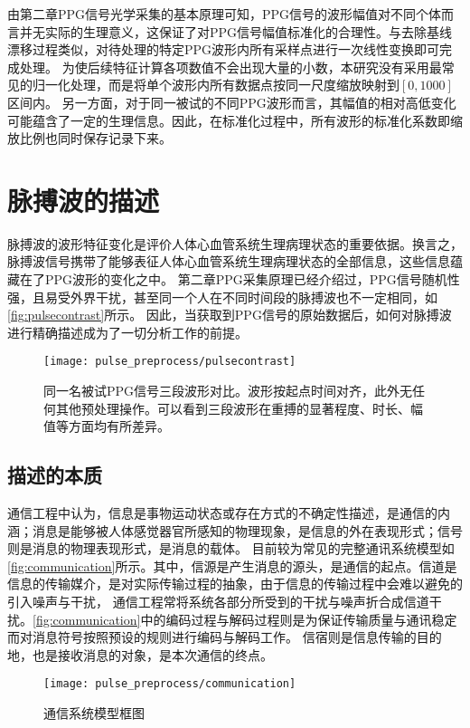 由第二章PPG信号光学采集的基本原理可知，PPG信号的波形幅值对不同个体而言并无实际的生理意义，这保证了对PPG信号幅值标准化的合理性。与去除基线漂移过程类似，对待处理的特定PPG波形内所有采样点进行一次线性变换即可完成处理。
为使后续特征计算各项数值不会出现大量的小数，本研究没有采用最常见的归一化处理，而是将单个波形内所有数据点按同一尺度缩放映射到$[0,1000]$区间内。
另一方面，对于同一被试的不同PPG波形而言，其幅值的相对高低变化可能蕴含了一定的生理信息。因此，在标准化过程中，所有波形的标准化系数即缩放比例也同时保存记录下来。

\section{脉搏波的描述}
脉搏波的波形特征变化是评价人体心血管系统生理病理状态的重要依据\cite{PPGYY}。换言之，脉搏波信号携带了能够表征人体心血管系统生理病理状态的全部信息，这些信息蕴藏在了PPG波形的变化之中。
第二章PPG采集原理已经介绍过，PPG信号随机性强，且易受外界干扰，甚至同一个人在不同时间段的脉搏波也不一定相同，如\autoref{fig:pulsecontrast}所示。
因此，当获取到PPG信号的原始数据后，如何对脉搏波进行精确描述成为了一切分析工作的前提。
\begin{figure}[htbp]
    \centering
    \texttt{[image: pulse\_preprocess/pulsecontrast]}
    \caption[同一名被试PPG信号三段波形对比]{\label{fig:pulsecontrast}同一名被试PPG信号三段波形对比。波形按起点时间对齐，此外无任何其他预处理操作。可以看到三段波形在重搏的显著程度、时长、幅值等方面均有所差异。}
\end{figure}
\subsection{描述的本质}
通信工程中认为，信息是事物运动状态或存在方式的不确定性描述，是通信的内涵；消息是能够被人体感觉器官所感知的物理现象，是信息的外在表现形式；信号则是消息的物理表现形式，是消息的载体\cite{Shannon1948,Liu2019,Zhao2017}。
目前较为常见的完整通讯系统模型如\autoref{fig:communication}所示。其中，信源是产生消息的源头，是通信的起点。信道是信息的传输媒介，是对实际传输过程的抽象，由于信息的传输过程中会难以避免的引入噪声与干扰，
通信工程常将系统各部分所受到的干扰与噪声折合成信道干扰。\autoref{fig:communication}中的编码过程与解码过程则是为保证传输质量与通讯稳定而对消息符号按照预设的规则进行编码与解码工作。
信宿则是信息传输的目的地，也是接收消息的对象，是本次通信的终点\cite{Zhao2017}。
\begin{figure}[htbp]
    \centering
    \texttt{[image: pulse\_preprocess/communication]}
    \caption[通信系统模型框图]{\label{fig:communication}通信系统模型框图\cite{Zhao2017,Liu2019}}
\end{figure}

